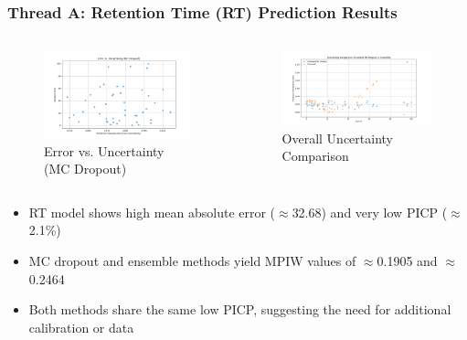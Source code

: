 \documentclass{beamer}
\begin{document}
\begin{frame}
  \frametitle{Thread A: Retention Time (RT) Prediction Results}
  \begin{columns}
      \begin{figure}
        \includegraphics[width=0.95\linewidth]{reports/mc_dropout_error_vs_uncertainty.png}
        \caption{Error vs. Uncertainty (MC Dropout)}
      \end{figure}
      \begin{figure}
        \includegraphics[width=0.95\linewidth]{reports/uncertainty_comparison.png}
        \caption{Overall Uncertainty Comparison}
      \end{figure}
  \end{columns}
  \begin{itemize}
    \item RT model shows high mean absolute error ($\approx$32.68) and very low PICP ($\approx$2.1\%)
    \item MC dropout and ensemble methods yield MPIW values of $\approx$0.1905 and $\approx$0.2464
    \item Both methods share the same low PICP, suggesting the need for additional calibration or data
  \end{itemize}
\end{frame}
\end{document}
